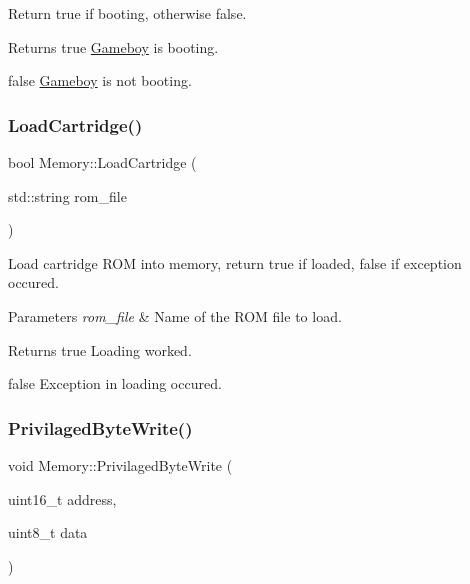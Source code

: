 Return true if booting, otherwise false. 

\begin{DoxyReturn}{Returns}
true \mbox{\hyperlink{classGameboy}{Gameboy}} is booting. 

false \mbox{\hyperlink{classGameboy}{Gameboy}} is not booting. 
\end{DoxyReturn}
\mbox{\label{classMemory_aa118a4c741282594d0c0d913ceac3da4}} 
\subsubsection{\texorpdfstring{Load\+Cartridge()}{LoadCartridge()}}
{\footnotesize\ttfamily bool Memory\+::\+Load\+Cartridge (\begin{DoxyParamCaption}\item[{std\+::string}]{rom\+\_\+file }\end{DoxyParamCaption})}



Load cartridge R\+OM into memory, return true if loaded, false if exception occured. 


\begin{DoxyParams}{Parameters}
{\em rom\+\_\+file} & Name of the R\+OM file to load. \\
\hline
\end{DoxyParams}
\begin{DoxyReturn}{Returns}
true Loading worked. 

false Exception in loading occured. 
\end{DoxyReturn}
\mbox{\label{classMemory_a70a1de728fa4adac9b2da63c8434d909}} 
\subsubsection{\texorpdfstring{Privilaged\+Byte\+Write()}{PrivilagedByteWrite()}}
{\footnotesize\ttfamily void Memory\+::\+Privilaged\+Byte\+Write (\begin{DoxyParamCaption}\item[{uint16\+\_\+t}]{address,  }\item[{uint8\+\_\+t}]{data }\end{DoxyParamCaption})}




